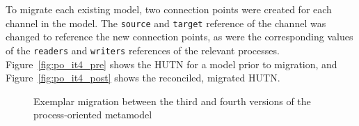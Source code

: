 To migrate each existing model, two connection points were created for each channel in the model. The \texttt{s\-ou\-r\-ce} and \texttt{ta\-rg\-et} reference of the channel was changed to reference the new connection points, as were the corresponding values of the \texttt{re\-ad\-e\-rs} and \texttt{wr\-it\-e\-rs} references of the relevant processes. Figure~\ref{fig:po_it4_pre} shows the HUTN for a model prior to migration, and Figure~\ref{fig:po_it4_post} shows the reconciled, migrated HUTN.

\begin{figure}[htbp]
	\centering
	\caption{Exemplar migration between the third and fourth versions of the process-oriented metamodel}
\end{figure}

